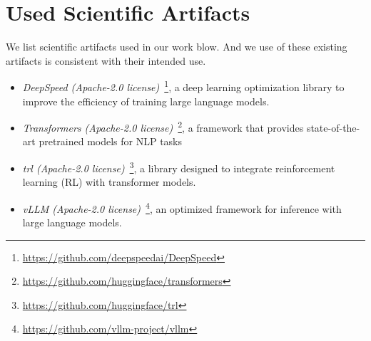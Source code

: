 \section{Used Scientific Artifacts}
\label{sec:Scientific}
We list scientific artifacts used in our work blow.  And we use of these existing artifacts is consistent with their intended use.
\begin{itemize} [itemsep=1pt]
    
    \item \textit{DeepSpeed (Apache-2.0 license)}~\footnote{ \url{https://github.com/deepspeedai/DeepSpeed}}, a deep learning optimization library to improve the efficiency of training large language models.
    \item \textit{Transformers (Apache-2.0 license)}~\footnote{ \url{https://github.com/huggingface/transformers}}, a framework that provides state-of-the-art pretrained models for NLP tasks
    \item \textit{trl (Apache-2.0 license)}~\footnote{ \url{https://github.com/huggingface/trl}}, a library designed to integrate reinforcement learning (RL) with transformer models.
    \item \textit{vLLM (Apache-2.0 license)}~\footnote{ \url{https://github.com/vllm-project/vllm}}, an optimized framework for inference with large language models.
    
\end{itemize}


